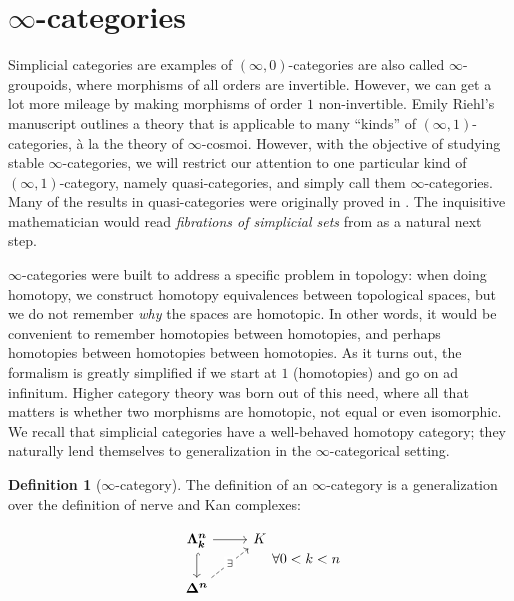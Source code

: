 \documentclass[10pt]{amsart}
\makeatletter
\newcommand{\8}{\ensuremath{\infty}}
\newcommand{\0}{\ensuremath{\overset{\rightarrow}{0}}}
\newcommand{\1}{\ensuremath{\mathbf{1}}}
\newcommand{\Simplex}[1]{\ensuremath{\boldsymbol{\Delta^{#1}}}}
\newcommand{\Horn}[2]{\ensuremath{\boldsymbol{\Lambda^{#1}_{#2}}}}
\theoremstyle{definition}
\newtheorem{definition}{Definition}[section]
\def\subsection{\@startsection{subsection}{2}
  \z@{.5\linespacing\@plus.7\linespacing}{.6\baselineskip}{\centering}}
\numberwithin{definition}{subsection}
\numberwithin{definition}{section}
\makeatother
\begin{document}
\section{\texorpdfstring{\8}{∞}-categories}
Simplicial categories are examples of $(\8, 0)$-categories are also called \8-groupoids, where morphisms of all orders are invertible. However, we can get a lot more mileage by making morphisms of order $1$ non-invertible. Emily Riehl's manuscript \cite{Riehl18} outlines a theory that is applicable to many ``kinds'' of $(\8, 1)$-categories, à la the theory of \8-cosmoi. However, with the objective of studying stable \8-categories, we will restrict our attention to one particular kind of $(\8, 1)$-category, namely quasi-categories, and simply call them \8-categories. Many of the results in quasi-categories were originally proved in \cite{Joyal08}. The inquisitive mathematician would read \emph{fibrations of simplicial sets} from \cite{Lurie09a} as a natural next step.

\subsection{Motivation}
\8-categories were built to address a specific problem in topology: when doing homotopy, we construct homotopy equivalences between topological spaces, but we do not remember \emph{why} the spaces are homotopic. In other words, it would be convenient to remember homotopies between homotopies, and perhaps homotopies between homotopies between homotopies. As it turns out, the formalism is greatly simplified if we start at $1$ (homotopies) and go on ad infinitum. Higher category theory was born out of this need, where all that matters is whether two morphisms are homotopic, not equal or even isomorphic. We recall that simplicial categories have a well-behaved homotopy category; they naturally lend themselves to generalization in the \8-categorical setting.

\begin{definition}[\8-category]
  The definition of an \8-category is a generalization over the definition of nerve and Kan complexes:

  \begin{equation*}
    \begin{tikzcd}
      \Horn{n}{k} \arrow[d, hookrightarrow] \arrow[r] & K \\
      \Simplex{n} \arrow[ur, dashed, "\exists" description]
    \end{tikzcd} \forall 0 < k < n
  \end{equation*}
\end{definition}
\end{document}
